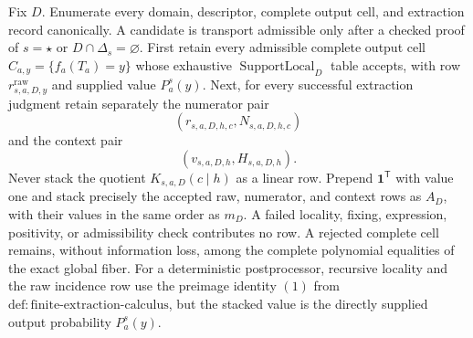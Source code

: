 Fix \(D\).  Enumerate every domain, descriptor, complete output cell, and extraction record canonically.  A candidate is transport admissible only after a checked proof of \(s=\star\) or \(D\cap\Delta_s=\varnothing\).  First retain every admissible complete output cell \(C_{a,y}=\{f_a(T_a)=y\}\) whose exhaustive \(\operatorname{SupportLocal}_D\) table accepts, with row \(r^{\mathrm{raw}}_{s,a,D,y}\) and supplied value \(P_a^s(y)\).  Next, for every successful extraction judgment retain separately the numerator pair
\[
(r_{s,a,D,h,c},N_{s,a,D,h,c})
\]
and the context pair
\[
(v_{s,a,D,h},H_{s,a,D,h}).
\]
Never stack the quotient \(K_{s,a,D}(c\mid h)\) as a linear row.  Prepend \(\mathbf 1^{\mathsf T}\) with value one and stack precisely the accepted raw, numerator, and context rows as \(A_D\), with their values in the same order as \(m_D\).  A failed locality, fixing, expression, positivity, or admissibility check contributes no row.  A rejected complete cell remains, without information loss, among the complete polynomial equalities of the exact global fiber.  For a deterministic postprocessor, recursive locality and the raw incidence row use the preimage identity \((1)\) from \(\mathrm{def:finite\text{-}extraction\text{-}calculus}\), but the stacked value is the directly supplied output probability \(P_a^s(y)\).